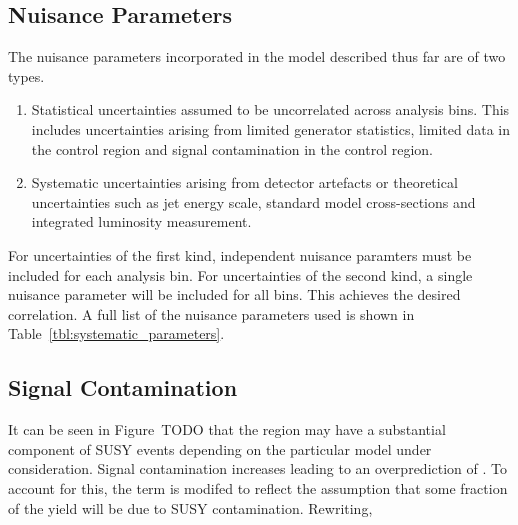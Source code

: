 \subsection{Nuisance Parameters}
The nuisance parameters incorporated in the model described thus far are of two
types.
\begin{enumerate}
\item Statistical uncertainties assumed to be uncorrelated across analysis
  bins. This includes uncertainties arising from limited generator statistics,
  limited data in the control region and signal contamination in the control
  region.
\item Systematic uncertainties arising from detector artefacts or theoretical
  uncertainties such as jet energy scale, standard model cross-sections and
  integrated luminosity measurement.
\end{enumerate}
For uncertainties of the first kind, independent nuisance paramters must be
included for each analysis bin. For uncertainties of the second kind, a
single nuisance parameter will be included for all bins. This achieves the
desired correlation. A full list of the nuisance parameters used is shown in
Table~\ref{tbl:systematic_parameters}.



\subsection{Signal Contamination}
It can be seen in Figure~TODO that the region \LPcontrol may have a substantial
component of \ac{SUSY} events depending on the particular model under
consideration. Signal contamination increases \NControl leading to an
overprediction of \NBkg. To account for this, the \NBkgi term is modifed to
reflect the assumption that some fraction of the yield \NControli will be
due to \ac{SUSY} contamination. Rewriting,

